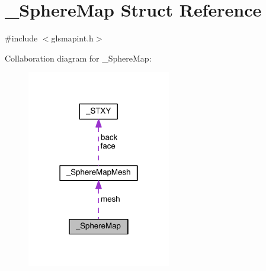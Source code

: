 \hypertarget{struct___sphere_map}{\section{\-\_\-\-Sphere\-Map Struct Reference}
\label{struct___sphere_map}
}


{\ttfamily \#include $<$glsmapint.\-h$>$}



Collaboration diagram for \-\_\-\-Sphere\-Map\-:
\nopagebreak
\begin{figure}[H]
\begin{center}
\leavevmode
\includegraphics[width=178pt]{struct___sphere_map__coll__graph}
\end{center}
\end{figure}
